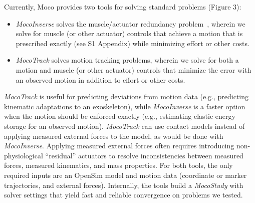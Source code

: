 \documentclass[10pt,letterpaper]{article}
\begin{document}
Currently, Moco provides two tools for solving standard problems (Figure 3):
\begin{itemize}
\item \textit{\textit{MocoInverse}} solves the muscle/actuator redundancy problem~\cite{Groote:2016dq}, wherein we solve for muscle (or other actuator) controls that achieve a motion that is prescribed exactly (see S1 Appendix) while minimizing effort or other costs.
\item \textit{\textit{MocoTrack}} solves motion tracking problems, wherein we solve for both a motion and muscle (or other actuator) controls that minimize the error with an observed motion in addition to effort or other costs.
\end{itemize}
\textit{MocoTrack} is useful for predicting deviations from motion data (e.g., predicting kinematic adaptations to an exoskeleton), while \textit{MocoInverse} is a faster option when the motion should be enforced exactly (e.g., estimating elastic energy storage for an observed motion). \textit{MocoTrack} can use contact models instead of applying measured external forces to the model, as would be done with \textit{MocoInverse}. Applying measured external forces often requires introducing non-physiological “residual” actuators to resolve inconsistencies between measured forces, measured kinematics, and mass properties. For both tools, the only required inputs are an OpenSim model and motion data (coordinate or marker trajectories, and external forces). Internally, the tools build a \textit{MocoStudy} with solver settings that yield fast and reliable convergence on problems we tested.
\end{document}
